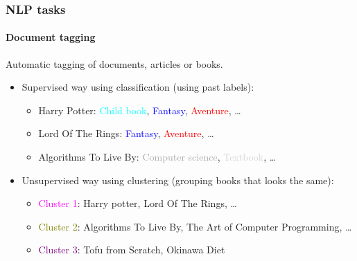 \documentclass[9pt]{beamer}
\begin{document}
\begin{frame}
  \frametitle{NLP tasks}

  \framesubtitle{Document tagging}

  Automatic tagging of documents, articles or books.

  \bigskip

  \begin{itemize}
  \item Supervised way using classification (using past labels):
    \begin{itemize}
    \item Harry Potter: \textcolor{cyan}{Child book}, \textcolor{blue}{Fantasy},
      \textcolor{red}{Aventure}, \dots
    \item Lord Of The Rings: \textcolor{blue}{Fantasy},
      \textcolor{red}{Aventure}, \dots
    \item Algorithms To Live By: \textcolor{darkgray}{Computer
      science}, \textcolor{lightgray}{Textbook}, \dots
    \end{itemize}

    \bigskip

  \item Unsupervised way using clustering (grouping books that looks the same):
    \begin{itemize}
    \item \textcolor{magenta}{Cluster 1}: Harry potter, Lord Of The
      Rings, \dots
    \item \textcolor{olive}{Cluster 2}: Algorithms To Live By, The Art
      of Computer Programming, \dots
    \item \textcolor{purple}{Cluster 3}: Tofu from Scratch, Okinawa
      Diet
    \end{itemize}
  \end{itemize}
\end{frame}
\end{document}
